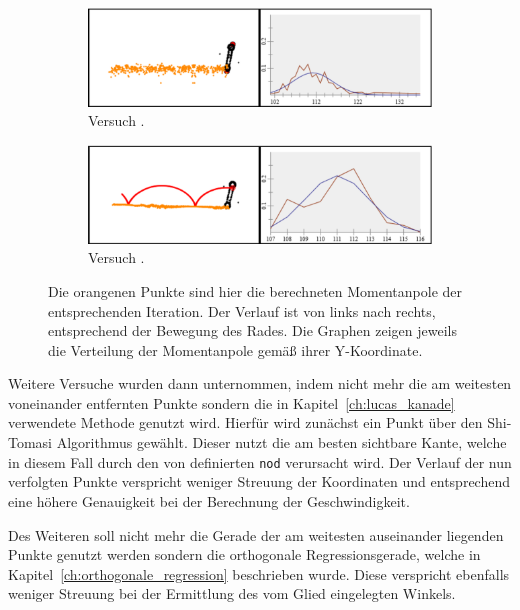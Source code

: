 \begin{figure}
    \centering
    \begin{subfigure}[t]{0.45\textwidth}
        \includegraphics[width=\textwidth]{gfx/drehendes_rad_1.png}
        \caption{Versuch .}\label{fig:drehendes_rad_1}
    \end{subfigure}
    \begin{subfigure}[t]{0.45\textwidth}
        \includegraphics[width=\textwidth]{gfx/drehendes_rad_4.png}
        \caption{Versuch .}\label{fig:drehendes_rad_4}
    \end{subfigure}
    \caption[Versuche  und ]{Die orangenen Punkte sind hier die berechneten Momentanpole der entsprechenden Iteration. Der Verlauf ist von links nach rechts, entsprechend der Bewegung des Rades. Die Graphen zeigen jeweils die Verteilung der Momentanpole gemä{\ss} ihrer Y-Koordinate.}
    \label{fig:drehendes_rad_1_4}
\end{figure}

Weitere Versuche wurden dann unternommen, indem nicht mehr die am weitesten voneinander entfernten Punkte sondern die in Kapitel~\ref{ch:lucas_kanade} verwendete Methode genutzt wird.
Hierfür wird zunächst ein Punkt über den Shi-Tomasi Algorithmus gewählt.
Dieser nutzt die am besten sichtbare Kante, welche in diesem Fall durch den von  definierten \lstinline{nod} verursacht wird.
Der Verlauf der nun verfolgten Punkte verspricht weniger Streuung der Koordinaten und entsprechend eine höhere Genauigkeit bei der Berechnung der Geschwindigkeit.

Des Weiteren soll nicht mehr die Gerade der am weitesten auseinander liegenden Punkte genutzt werden sondern die orthogonale Regressionsgerade, welche in Kapitel~\ref{ch:orthogonale_regression} beschrieben wurde.
Diese verspricht ebenfalls weniger Streuung bei der Ermittlung des vom Glied eingelegten Winkels.

